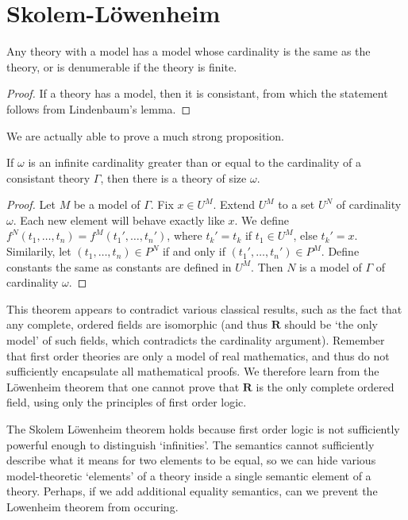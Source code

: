 \section{Skolem-L\"{o}wenheim}

\begin{theorem}
    Any theory with a model has a model whose cardinality is the same as the theory, or is denumerable if the theory is finite.
\end{theorem}
\begin{proof}
    If a theory has a model, then it is consistant, from which the statement follows from Lindenbaum's lemma.
\end{proof}

We are actually able to prove a much strong proposition.

\begin{corollary}
    If $\omega$ is an infinite cardinality greater than or equal to the cardinality of a consistant theory $\Gamma$, then there is a theory of size $\omega$.
\end{corollary}
\begin{proof}
    Let $M$ be a model of $\Gamma$. Fix $x \in U^M$. Extend $U^M$ to a set $U^N$ of cardinality $\omega$. Each new element will behave exactly like $x$. We define $f^N(t_1, \dots, t_n) = f^M(t_1', \dots, t_n')$, where $t_k' = t_k$ if $t_1 \in U^M$, else $t_k' = x$. Similarily, let $(t_1, \dots, t_n) \in P^N$ if and only if $(t_1', \dots, t_n') \in P^M$. Define constants the same as constants are defined in $U^M$. Then $N$ is a model of $\Gamma$ of cardinality $\omega$.
\end{proof}

This theorem appears to contradict various classical results, such as the fact that any complete, ordered fields are isomorphic (and thus $\mathbf{R}$ should be `the only model' of such fields, which contradicts the cardinality argument). Remember that first order theories are only a model of real mathematics, and thus do not sufficiently encapsulate all mathematical proofs. We therefore learn from the L\"{o}wenheim theorem that one cannot prove that $\mathbf{R}$ is the only complete ordered field, using only the principles of first order logic.

The Skolem L\"{o}wenheim theorem holds because first order logic is not sufficiently powerful enough to distinguish `infinities'. The semantics cannot sufficiently describe what it means for two elements to be equal, so we can hide various model-theoretic `elements' of a theory inside a single semantic element of a theory. Perhaps, if we add additional equality semantics, can we prevent the Lowenheim theorem from occuring.

